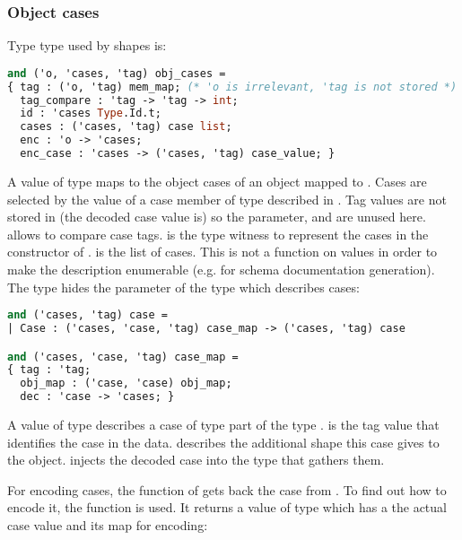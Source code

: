 \documentclass[nolinenum]{jfp}
\begin{document}
\subsubsection{Object cases}
\label{sec:obj_cases}

Type type  used by  shapes is:

\begin{lstlisting}[language=ocaml]
and ('o, 'cases, 'tag) obj_cases =
{ tag : ('o, 'tag) mem_map; (* 'o is irrelevant, 'tag is not stored *)
  tag_compare : 'tag -> 'tag -> int;
  id : 'cases Type.Id.t;
  cases : ('cases, 'tag) case list;
  enc : 'o -> 'cases;
  enc_case : 'cases -> ('cases, 'tag) case_value; }
\end{lstlisting}
%
A value  of type  maps to  the
object cases of an object mapped to . Cases are selected by
the value of a case member of type  described in
. Tag values are not stored in  (the decoded case
value is) so the  parameter,  and
 are unused here.  allows to
compare case tags.  is the type witness to represent the
cases in the constructor of .  is the list of
cases. This is not a function on  values in order to make
the description enumerable (e.g. for schema documentation
generation). The type  hides the 
parameter of the type  which describes cases:

\begin{lstlisting}[language=ocaml]
and ('cases, 'tag) case =
| Case : ('cases, 'case, 'tag) case_map -> ('cases, 'tag) case

and ('cases, 'case, 'tag) case_map =
{ tag : 'tag;
  obj_map : ('case, 'case) obj_map;
  dec : 'case -> 'cases; }
\end{lstlisting}
%
A value  of type  describes a case of type
 part of the type .  is the tag
value that identifies the case in the data.  describes the
additional shape this case gives to the object.  injects
the decoded case into the type that gathers them.

For encoding cases, the  function of 
gets back the case from . To find out how to encode it, the
function  is used. It returns a value of type
 which has a the actual case value and its map
for encoding:
\end{document}
